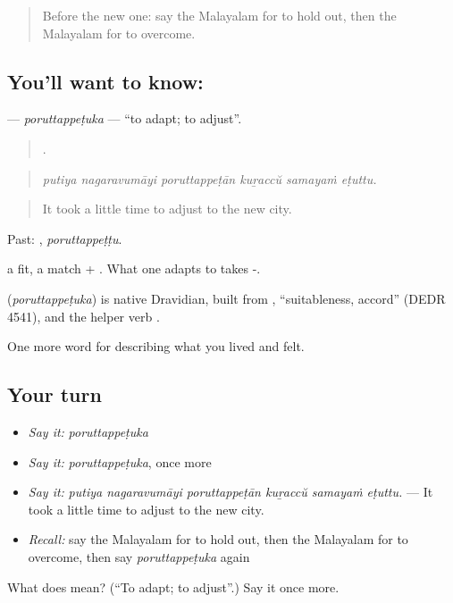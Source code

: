 \label{lesson:ML-C567-poruttappetuka}



\begin{quote}
Before the new one: say the Malayalam for to hold out, then the Malayalam for to overcome.
\end{quote}

\subsection*{You'll want to know: }
\textbf{} — \emph{poruttappeṭuka} — \textquotedblleft{}to adapt; to adjust\textquotedblright{}.

\begin{quote}
     .
\end{quote}

\begin{quote}
\emph{putiya nagaravumāyi poruttappeṭān kuṟaccŭ samayaṁ eṭuttu.}
\end{quote}

\begin{quote}
It took a little time to adjust to the new city.
\end{quote}

Past: , \emph{poruttappeṭṭu}.

 a fit, a match + . What one adapts to takes -.

\begin{cousinweb}
\textbf{} (\emph{poruttappeṭuka}) is native Dravidian, built from , \textquotedblleft{}suitableness, accord\textquotedblright{} (DEDR 4541), and the helper verb .
\end{cousinweb}

\begin{grammarlens}[title={What you've built}]
One more word for describing what you lived and felt.
\end{grammarlens}

\subsection*{Your turn}
\begin{itemize}
\raggedright
  \item \emph{Say it:} \emph{poruttappeṭuka}
  \item \emph{Say it:} \emph{poruttappeṭuka}, once more
  \item \emph{Say it:} \emph{putiya nagaravumāyi poruttappeṭān kuṟaccŭ samayaṁ eṭuttu.} — It took a little time to adjust to the new city.
  \item \emph{Recall:} say the Malayalam for to hold out, then the Malayalam for to overcome, then say \emph{poruttappeṭuka} again
\end{itemize}

\begin{tcolorbox}[breakable,colback=teal!4,colframe=teal!35!black,title={Before you move on}]
What does  mean? (\textquotedblleft{}To adapt; to adjust\textquotedblright{}.) Say it once more.
\end{tcolorbox}

